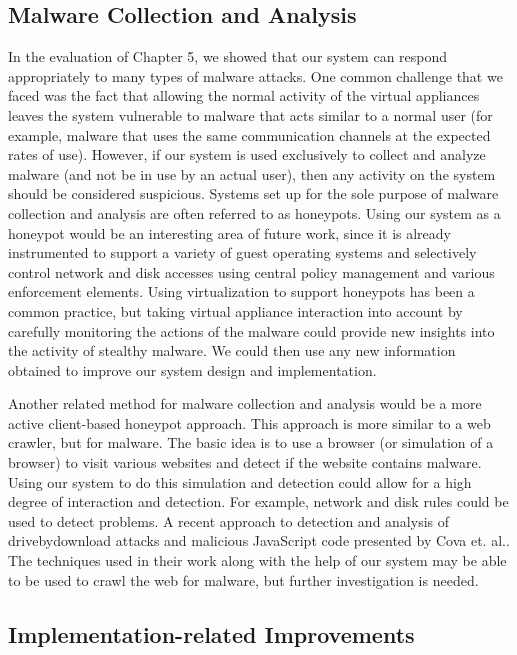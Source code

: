 \subsection{Malware Collection and Analysis}

In the evaluation of Chapter 5, we showed that our system can respond appropriately to many types of malware attacks. One common challenge that we faced was the fact that allowing the normal activity of the virtual appliances leaves the system vulnerable to malware that acts similar to a normal user (for example, malware that uses the same communication channels at the expected rates of use). However, if our system is used exclusively to collect and analyze malware (and not be in use by an actual user), then any activity on the system should be considered suspicious. Systems set up for the sole purpose of malware collection and analysis are often referred to as honeypots. Using our system as a honeypot would be an interesting area of future work, since it is already instrumented to support a variety of guest operating systems and selectively control network and disk accesses using central policy management and various enforcement elements. Using virtualization to support honeypots has been a common practice\cite{vrable_2005}, but taking virtual appliance interaction into account by carefully monitoring the actions of the malware could provide new insights into the activity of stealthy malware. We could then use any new information obtained to improve our system design and implementation.

Another related method for malware collection and analysis would be a more active client-based honeypot approach. This approach is more similar to a web crawler, but for malware. The basic idea is to use a browser (or simulation of a browser) to visit various websites and detect if the website contains malware.  Using our system to do this simulation and detection could allow for a high degree of interaction and detection. For example, network and disk rules could be used to detect problems. A recent approach to detection and analysis of drive\-by\-download attacks and malicious JavaScript code presented by Cova et. al.\cite{cova_2010}. The techniques used in their work along with the help of our system may be able to be used to crawl the web for malware, but further investigation is needed.

\subsection{Implementation-related Improvements}

